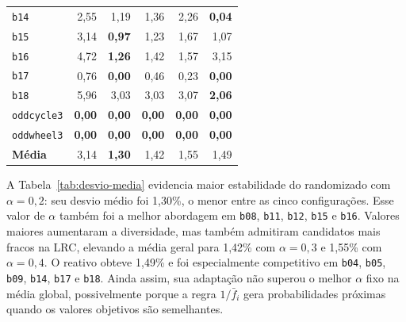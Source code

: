 \documentclass[12pt]{article}
\begin{document}
\begin{table}[htbp]
\begin{tabular}{lrrrrr}
\texttt{b14} & 2,55 & 1,19 & 1,36 & 2,26 & \textbf{0,04}\\
\texttt{b15} & 3,14 & \textbf{0,97} & 1,23 & 1,67 & 1,07\\
\texttt{b16} & 4,72 & \textbf{1,26} & 1,42 & 1,57 & 3,15\\
\texttt{b17} & 0,76 & \textbf{0,00} & 0,46 & 0,23 & \textbf{0,00}\\
\texttt{b18} & 5,96 & 3,03 & 3,03 & 3,07 & \textbf{2,06}\\
\texttt{oddcycle3} & \textbf{0,00} & \textbf{0,00} & \textbf{0,00} & \textbf{0,00} & \textbf{0,00}\\
\texttt{oddwheel3} & \textbf{0,00} & \textbf{0,00} & \textbf{0,00} & \textbf{0,00} & \textbf{0,00}\\
\midrule
\textbf{Média} & 3,14 & \textbf{1,30} & 1,42 & 1,55 & 1,49\\
\bottomrule
\end{tabular}
\end{table}

A Tabela~\ref{tab:desvio-media} evidencia maior estabilidade do randomizado com $\alpha=0{,}2$: seu desvio médio foi 1,30\%, o menor entre as cinco configurações. Esse valor de $\alpha$ também foi a melhor abordagem em \texttt{b08}, \texttt{b11}, \texttt{b12}, \texttt{b15} e \texttt{b16}. Valores maiores aumentaram a diversidade, mas também admitiram candidatos mais fracos na LRC, elevando a média geral para 1,42\% com $\alpha=0{,}3$ e 1,55\% com $\alpha=0{,}4$. O reativo obteve 1,49\% e foi especialmente competitivo em \texttt{b04}, \texttt{b05}, \texttt{b09}, \texttt{b14}, \texttt{b17} e \texttt{b18}. Ainda assim, sua adaptação não superou o melhor $\alpha$ fixo na média global, possivelmente porque a regra $1/\bar f_i$ gera probabilidades próximas quando os valores objetivos são semelhantes.
\end{document}

